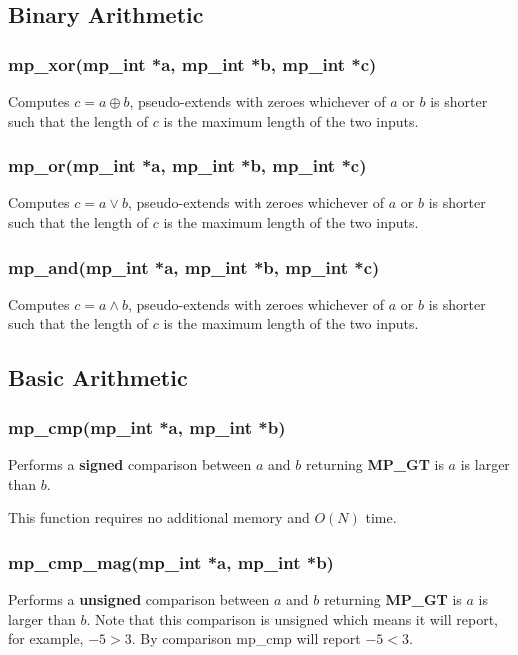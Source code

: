 \documentclass{article}
\begin{document}
\subsection{Binary Arithmetic}
\subsubsection{mp\_xor(mp\_int *a, mp\_int *b, mp\_int *c)}
Computes $c = a \oplus b$, pseudo-extends with zeroes whichever of $a$ or $b$ is shorter such that the length
of $c$ is the maximum length of the two inputs.

\subsubsection{mp\_or(mp\_int *a, mp\_int *b, mp\_int *c)}
Computes $c = a \lor b$, pseudo-extends with zeroes whichever of $a$ or $b$ is shorter such that the length
of $c$ is the maximum length of the two inputs.

\subsubsection{mp\_and(mp\_int *a, mp\_int *b, mp\_int *c)}
Computes $c = a \land b$, pseudo-extends with zeroes whichever of $a$ or $b$ is shorter such that the length
of $c$ is the maximum length of the two inputs.


\subsection{Basic Arithmetic}

\subsubsection{mp\_cmp(mp\_int *a, mp\_int *b)}
Performs a \textbf{signed} comparison between $a$ and $b$ returning \textbf{MP\_GT} is $a$ is larger than $b$.

This function requires no additional memory and $O(N)$ time.

\subsubsection{mp\_cmp\_mag(mp\_int *a, mp\_int *b)}
Performs a \textbf{unsigned} comparison between $a$ and $b$ returning \textbf{MP\_GT} is $a$ is larger than $b$.  Note 
that this comparison is unsigned which means it will report, for example, $-5 > 3$.  By comparison mp\_cmp will 
report $-5 < 3$.
\end{document}
